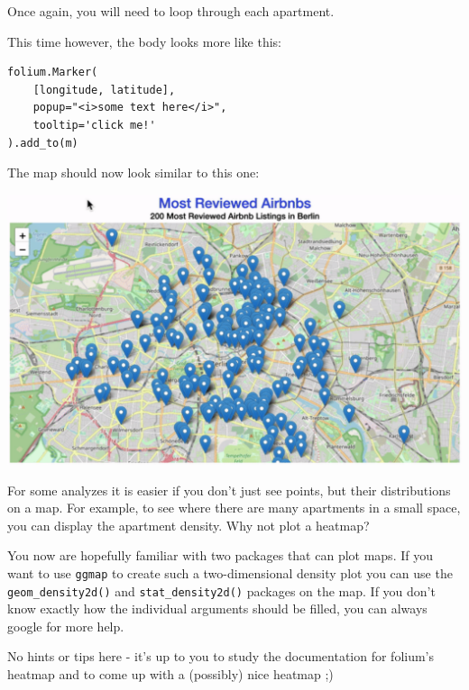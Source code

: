 \documentclass[
  11pt,
]{article}
\newenvironment{tips}[1]
  {
  \begin{itemize}
  \footnotesize
  \renewcommand{\labelitemi}{
    \raisebox{-.7\height}[0pt][0pt]{
      {\setkeys{Gin}{width=3em,keepaspectratio}
        \texttt{[image: images/\#1.png]}}
    }
  }
  \setlength{\fboxsep}{1em}
  \begin{rbox}
  \item
  }
  {
  \end{rbox}
  \end{itemize}
  }
\newenvironment{tipsp}[1]
  {
  \begin{itemize}
  \footnotesize
  \renewcommand{\labelitemi}{
    \raisebox{-.7\height}[0pt][0pt]{
      {\setkeys{Gin}{width=3em,keepaspectratio}
        \texttt{[image: images/\#1.png]}}
    }
  }
  \setlength{\fboxsep}{1em}
  \begin{pbox}
  \item
  }
  {
  \end{pbox}
  \end{itemize}
  }
\begin{document}
\begin{tipsp}p

Once again, you will need to loop through each apartment.

This time however, the body looks more like this:

\begin{verbatim}
folium.Marker(
    [longitude, latitude], 
    popup="<i>some text here</i>", 
    tooltip='click me!'
).add_to(m)
\end{verbatim}


\end{tipsp}

The map should now look similar to this one:

\begin{center}\includegraphics[width=1\linewidth]{plot/01_python/map_popup} \end{center}

For some analyzes it is easier if you don't just see points, but their distributions on a map. For example, to see where there are many apartments in a small space, you can display the apartment density. Why not plot a heatmap?

\begin{tips}r
You now are hopefully familiar with two packages that can plot maps. If you want to use \texttt{ggmap} to create such a two-dimensional density plot you can use the \texttt{geom\_density2d()} and \texttt{stat\_density2d()} packages on the map. If you don't know exactly how the individual arguments should be filled, you can always google for more help.

\end{tips}

\begin{tipsp}p
No hints or tips here - it's up to you to study the documentation for folium's heatmap and to come up with a (possibly) nice heatmap ;)

\end{tipsp}
\end{document}
